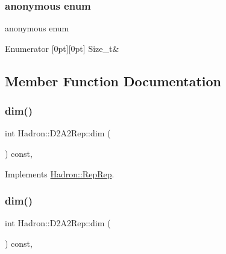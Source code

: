 \subsubsection{\texorpdfstring{anonymous enum}{anonymous enum}}
{\footnotesize\ttfamily anonymous enum}

\begin{DoxyEnumFields}{Enumerator}
[0pt][0pt]{}\mbox{\label{structHadron_1_1D2A2Rep_aec077c8e2ad6da605379037fa0580691aef43e7d095036291143d3c7358dfe1c6}} 
Size\+\_\+t&\\
\hline

\end{DoxyEnumFields}


\subsection{Member Function Documentation}
\mbox{\label{structHadron_1_1D2A2Rep_a3ac73e94eff9828876d64a771f037bb5}} 
\subsubsection{\texorpdfstring{dim()}{dim()}\hspace{0.1cm}{\footnotesize\ttfamily [1/5]}}
{\footnotesize\ttfamily int Hadron\+::\+D2\+A2\+Rep\+::dim (\begin{DoxyParamCaption}{ }\end{DoxyParamCaption}) const\hspace{0.3cm}{\ttfamily [inline]}, {\ttfamily [virtual]}}



Implements \mbox{\hyperlink{structHadron_1_1RepRep_a92c8802e5ed7afd7da43ccfd5b7cd92b}{Hadron\+::\+Rep\+Rep}}.

\mbox{\label{structHadron_1_1D2A2Rep_a3ac73e94eff9828876d64a771f037bb5}} 
\subsubsection{\texorpdfstring{dim()}{dim()}\hspace{0.1cm}{\footnotesize\ttfamily [2/5]}}
{\footnotesize\ttfamily int Hadron\+::\+D2\+A2\+Rep\+::dim (\begin{DoxyParamCaption}{ }\end{DoxyParamCaption}) const\hspace{0.3cm}{\ttfamily [inline]}, {\ttfamily [virtual]}}



